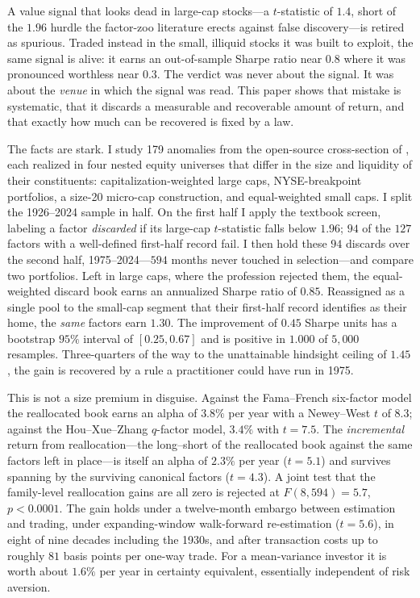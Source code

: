 \documentclass[12pt]{article}
\theoremstyle{plain}
\theoremstyle{definition}
\begin{document}
A value signal that looks dead in large-cap stocks---a $t$-statistic of $1.4$,
short of the $1.96$ hurdle the factor-zoo literature erects against false
discovery---is retired as spurious. Traded instead in the small, illiquid stocks
it was built to exploit, the same signal is alive: it earns an out-of-sample
Sharpe ratio near $0.8$ where it was pronounced worthless near $0.3$. The verdict
was never about the signal. It was about the \emph{venue} in which the signal was
read. This paper shows that mistake is systematic, that it discards a measurable
and recoverable amount of return, and that exactly how much can be recovered is
fixed by a law.

The facts are stark. I study 179 anomalies from the open-source cross-section of
\citet{ChenZimmermann2022}, each realized in four nested equity universes that
differ in the size and liquidity of their constituents: capitalization-weighted
large caps, NYSE-breakpoint portfolios, a size-20 micro-cap construction, and
equal-weighted small caps. I split the 1926--2024 sample in half. On the first
half I apply the textbook screen, labeling a factor \emph{discarded} if its
large-cap $t$-statistic falls below $1.96$; $94$ of the $127$ factors with a
well-defined first-half record fail. I
then hold these $94$ discards over the second half, 1975--2024---$594$ months
never touched in selection---and compare two portfolios. Left in large caps,
where the profession rejected them, the equal-weighted discard book earns an
annualized Sharpe ratio of $0.85$. Reassigned as a single pool to the small-cap
segment that their first-half record identifies as their home, the \emph{same}
factors earn $1.30$. The improvement of $0.45$ Sharpe units has a bootstrap
$95\%$ interval of $[0.25,0.67]$ and is positive in $1.000$ of $5{,}000$
resamples. Three-quarters of the way to the unattainable hindsight ceiling of
$1.45$, the gain is recovered by a rule a practitioner could have run in 1975.

This is not a size premium in disguise. Against the Fama--French six-factor
model the reallocated book earns an alpha of $3.8\%$ per year with a
Newey--West $t$ of $8.3$; against the Hou--Xue--Zhang $q$-factor model, $3.4\%$
with $t=7.5$. The \emph{incremental} return from reallocation---the long--short
of the reallocated book against the same factors left in place---is itself an
alpha of $2.3\%$ per year ($t=5.1$) and survives spanning by the surviving
canonical factors ($t=4.3$). A joint test that the family-level reallocation
gains are all zero is rejected at $F(8,594)=5.7$, $p<0.0001$. The gain holds
under a twelve-month embargo between estimation and trading, under
expanding-window walk-forward re-estimation ($t=5.6$), in eight of nine decades
including the 1930s, and after transaction costs up to roughly $81$ basis points
per one-way trade. For a mean-variance investor it is worth about $1.6\%$ per
year in certainty equivalent, essentially independent of risk aversion.
\end{document}
